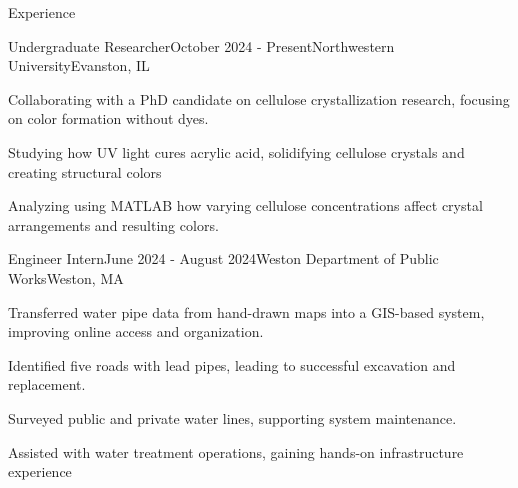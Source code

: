 \documentclass[
	a4paper, %
	9pt, %
]{resume} %
\begin{document}
\begin{rSection}{Experience}

	\begin{rSubsection}{Undergraduate Researcher}{October 2024 - Present}{Northwestern University}{Evanston, IL}
		\item Collaborating with a PhD candidate on cellulose crystallization research, focusing on color formation without dyes.
		\item Studying how UV light cures acrylic acid, solidifying cellulose crystals and creating structural colors
		\item Analyzing using MATLAB how varying cellulose concentrations affect crystal arrangements and resulting colors.
	\end{rSubsection}



	\begin{rSubsection}{Engineer Intern}{June 2024 - August 2024}{Weston Department of Public Works}{Weston, MA}
		\item Transferred water pipe data from hand-drawn maps into a GIS-based system, improving online access and organization.
		\item Identified five roads with lead pipes, leading to successful excavation and replacement.
		\item Surveyed public and private water lines, supporting system maintenance.
		\item Assisted with water treatment operations, gaining hands-on infrastructure experience
	\end{rSubsection}



\end{rSection}
\end{document}
